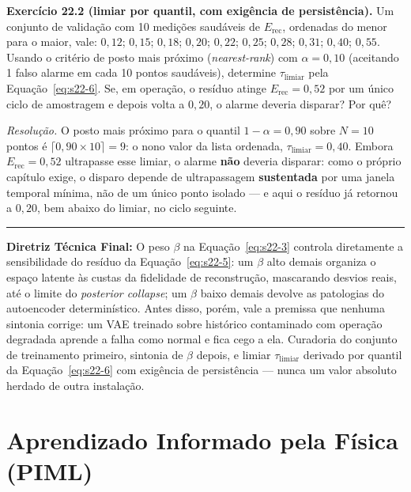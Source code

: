 \documentclass[12pt,a4paper]{article}
\numberwithin{equation}{section}
\numberwithin{table}{section}
\numberwithin{figure}{section}
\begin{document}
{	\textbf{Exercício 22.2 (limiar por quantil, com exigência de
	persistência).} Um conjunto de validação com 10 medições saudáveis de
	$E_{\text{rec}}$, ordenadas do menor para o maior, vale: $0{,}12$;
	$0{,}15$; $0{,}18$; $0{,}20$; $0{,}22$; $0{,}25$; $0{,}28$; $0{,}31$;
	$0{,}40$; $0{,}55$. Usando o critério de posto mais próximo
	(\textit{nearest-rank}) com $\alpha=0{,}10$ (aceitando 1 falso alarme
	em cada 10 pontos saudáveis), determine $\tau_{\text{limiar}}$ pela
	Equação~\eqref{eq:s22-6}. Se, em operação, o resíduo atinge
	$E_{\text{rec}}=0{,}52$ por um único ciclo de amostragem e depois
	volta a $0{,}20$, o alarme deveria disparar? Por quê?

	\emph{Resolução.} O posto mais próximo para o quantil $1-\alpha=0{,}90$
	sobre $N=10$ pontos é $\lceil 0{,}90 \times 10 \rceil = 9$: o nono
	valor da lista ordenada, $\tau_{\text{limiar}} = 0{,}40$. Embora
	$E_{\text{rec}}=0{,}52$ ultrapasse esse limiar, o alarme \textbf{não}
	deveria disparar: como o próprio capítulo exige, o disparo depende de
	ultrapassagem \textbf{sustentada} por uma janela temporal mínima, não
	de um único ponto isolado --- e aqui o resíduo já retornou a
	$0{,}20$, bem abaixo do limiar, no ciclo seguinte.

	\vspace{1em}
	\hrule
	\vspace{1em}

	\textbf{Diretriz Técnica Final:} O peso $\beta$ na Equação~\eqref{eq:s22-3} controla diretamente a sensibilidade do resíduo da Equação~\eqref{eq:s22-5}: um $\beta$ alto demais organiza o espaço latente às custas da fidelidade de reconstrução, mascarando desvios reais, até o limite do \textit{posterior collapse}; um $\beta$ baixo demais devolve as patologias do autoencoder determinístico. Antes disso, porém, vale a premissa que nenhuma sintonia corrige: um VAE treinado sobre histórico contaminado com operação degradada aprende a falha como normal e fica cego a ela. Curadoria do conjunto de treinamento primeiro, sintonia de $\beta$ depois, e limiar $\tau_{\text{limiar}}$ derivado por quantil da Equação~\eqref{eq:s22-6} com exigência de persistência — nunca um valor absoluto herdado de outra instalação.

	\clearpage
	\section{Aprendizado Informado pela Física (PIML)}

}
\end{document}
